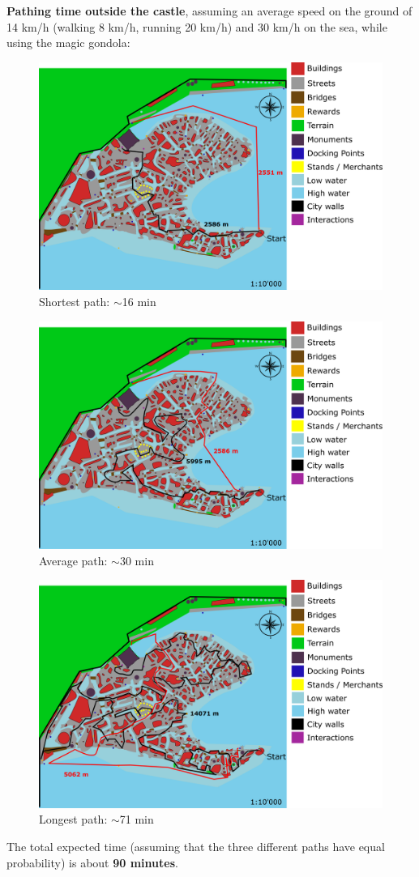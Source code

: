 \textbf{Pathing time outside the castle}, assuming an average speed on the ground of 14 km/h (walking 8 km/h, running 20 km/h) and 30 km/h on the sea, while using the magic gondola:
\begin{figure}[H]
    \centering
	\includegraphics[width=\textwidth]{Images/Diagrams/dynamiapath1.png}
	\caption{Shortest path: $\sim$16 min}
\end{figure}

\begin{figure}[H]
    \centering
	\includegraphics[width=\textwidth]{Images/Diagrams/dynamiapath2.png}
	\caption{Average path: $\sim$30 min}
\end{figure}

\begin{figure}[H]
    \centering
	\includegraphics[width=\textwidth]{Images/Diagrams/dynamiapath3.png}
	\caption{Longest path: $\sim$71 min}
\end{figure}

The total expected time (assuming that the three different paths have equal probability) is about \textbf{90 minutes}.
